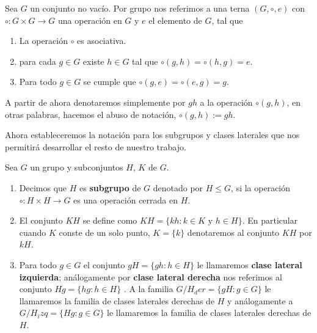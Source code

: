 	\begin{df}
Sea $G$ un conjunto no vacío. Por grupo nos referimos a una terna $(G, \circ, e)$ con $\circ:G \times G \to G$ una operación en $G$ y $e$ el elemento de $G$, tal que

	\begin{enumerate}
		\item La operación $\circ$ es asociativa.
		\item para cada $g \in G$ existe $h \in G$ tal que $ \circ (g,h)= \circ(h ,g)=e$.
		\item Para todo $g \in G$ se cumple que $\circ(g ,e) =  \circ(e,g) = g.$
	\end{enumerate}
	\end{df}

	\begin{cn}
A partir de ahora denotaremos simplemente por $gh$ a la operación $\circ(g,h)$, en otras palabras, hacemos el abuso de notación,  $\circ(g,h):=gh.$
	\end{cn}
	
	Ahora estableceremos la notación para los subgrupos y clases laterales que nos permitirá desarrollar el resto de nuestro trabajo. 	
	
	\begin{df}
	Sea $G$ un grupo y subconjuntos $H$, $K$ de $G$.
	\begin{enumerate}
		\item Decimos que $H$ es \textbf{subgrupo} de $G$ denotado por $H \leq G$, si la operación $\circ:H \times H \to G$ es una operación cerrada en $H$.
		
		\item El conjunto $KH$ se define como  $KH=\{kh: k \in K \text{ y } h \in H \}$. En particular cuando $K$ conste de un solo punto, $K=\{k\}$ denotaremos al conjunto $KH$ por $kH$.	
		
		\item Para todo $g \in G$ el conjunto $gH=\{gh:h \in H \}$ le llamaremos \textbf{clase lateral izquierda}; análogamente por \textbf{clase lateral derecha} nos referimos al conjunto $Hg=\{hg:h \in H\}$ . A la familia  $G/H_der=\{gH:g \in G\}$
le llamaremos la familia de clases laterales derechas de $H$ y análogamente a $G/H_izq=\{Hg:g \in G\}$
le llamaremos la familia de clases laterales derechas de $H$. 
	\end{enumerate} 
\end{df}	
	
